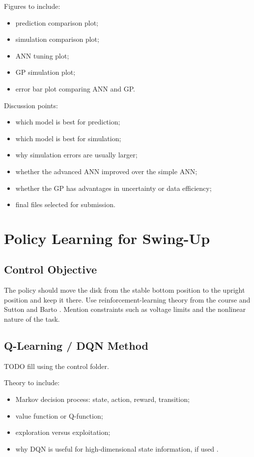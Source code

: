 \documentclass[conference]{IEEEtran}
\begin{document}
Figures to include:
\begin{itemize}
    \item prediction comparison plot;
    \item simulation comparison plot;
    \item ANN tuning plot;
    \item GP simulation plot;
    \item error bar plot comparing ANN and GP.
\end{itemize}

Discussion points:
\begin{itemize}
    \item which model is best for prediction;
    \item which model is best for simulation;
    \item why simulation errors are usually larger;
    \item whether the advanced ANN improved over the simple ANN;
    \item whether the GP has advantages in uncertainty or data efficiency;
    \item final files selected for submission.
\end{itemize}

\section{Policy Learning for Swing-Up}

\subsection{Control Objective}
The policy should move the disk from the stable bottom position to the upright position and keep it there.
Use reinforcement-learning theory from the course and Sutton and Barto \cite{course5sc28,sutton2018reinforcement}.
Mention constraints such as voltage limits and the nonlinear nature of the task.

\subsection{Q-Learning / DQN Method}
TODO fill using the control folder.

Theory to include:
\begin{itemize}
    \item Markov decision process: state, action, reward, transition;
    \item value function or Q-function;
    \item exploration versus exploitation;
    \item why DQN is useful for high-dimensional state information, if used \cite{mnih2015human}.
\end{itemize}
\end{document}
